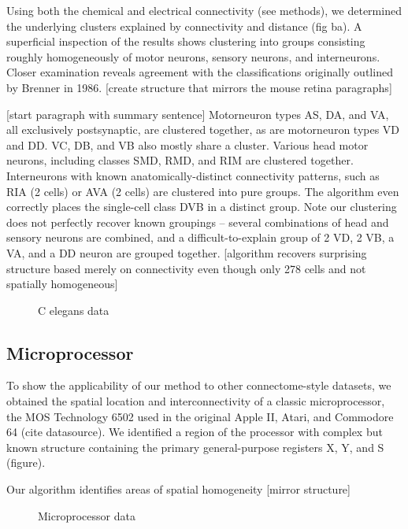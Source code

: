 \documentclass{article}
\begin{document}
Using both the chemical and electrical connectivity (see methods), we
determined the underlying clusters explained by connectivity and
distance (fig ba). A superficial inspection of the results shows
clustering into groups consisting roughly homogeneously of motor
neurons, sensory neurons, and interneurons. Closer examination reveals
agreement with the classifications originally outlined by Brenner in
1986.  [create structure that mirrors the mouse retina paragraphs]

[start paragraph with summary sentence] Motorneuron types AS, DA, and
VA, all exclusively postsynaptic, are clustered together, as are
motorneuron types VD and DD. VC, DB, and VB also mostly share a
cluster. Various head motor neurons, including classes SMD, RMD, and
RIM are clustered together. Interneurons with known
anatomically-distinct connectivity patterns, such as RIA (2 cells) or
AVA (2 cells) are clustered into pure groups. The algorithm even
correctly places the single-cell class DVB in a distinct group. Note
our clustering does not perfectly recover known groupings -- several
combinations of head and sensory neurons are combined, and a
difficult-to-explain group of 2 VD, 2 VB, a VA, and a DD neuron are
grouped together. [algorithm recovers surprising structure based
merely on connectivity even though only 278 cells and not spatially
homogeneous]








\begin{figure}
  \centering 
  \caption{C elegans data}
\end{figure}

\subsection{Microprocessor}

To show the applicability of our method to other connectome-style
datasets, we obtained the spatial location and interconnectivity of a
classic microprocessor, the MOS Technology 6502 used in the original
Apple II, Atari, and Commodore 64 (cite datasource). We identified a
region of the processor with complex but known structure containing
the primary general-purpose registers X, Y, and S (figure).

Our algorithm identifies areas of spatial homogeneity 
[mirror structure] 


\begin{figure}
  \centering 
  \caption{Microprocessor data}
\end{figure}
\end{document}
